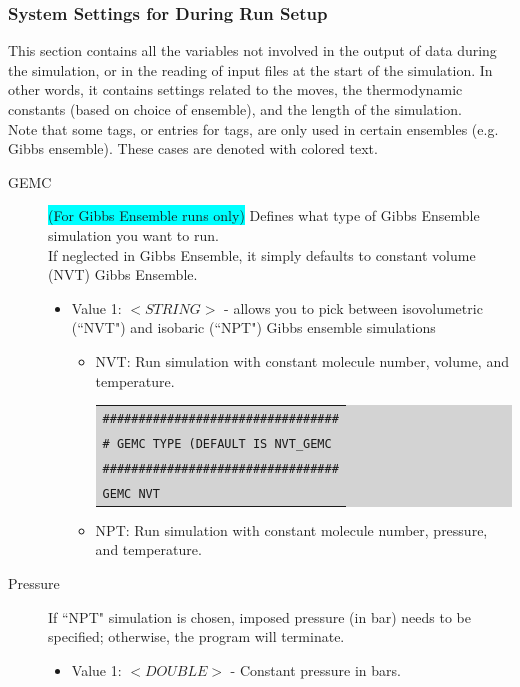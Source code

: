 \subsubsection{System Settings for During Run Setup}
This section contains all the variables not involved in the output of data during the simulation, or in the reading of input files at the start of the simulation.  In other words, it contains settings related to the moves, the thermodynamic constants (based on choice of ensemble), and the length of the simulation.\\
Note that some tags, or entries for tags, are only used in certain ensembles (e.g. Gibbs ensemble). These cases are denoted with colored text.\\
\begin{description}
\item [GEMC] \colorbox{cyan}{(For Gibbs Ensemble runs only)} Defines what type of Gibbs Ensemble simulation you want to run.\\
	If neglected in Gibbs Ensemble, it simply defaults to constant volume (NVT) Gibbs Ensemble.
	\begin{itemize}
	\item Value 1: $<STRING>$ - allows you to pick between isovolumetric (``NVT") and isobaric (``NPT") Gibbs ensemble simulations
		\begin{itemize}
		\item NVT: Run simulation with constant molecule number, volume, and temperature.\\
		\colorbox{lightgray}{
		\begin{tabular}{l}
		\texttt{\#\#\#\#\#\#\#\#\#\#\#\#\#\#\#\#\#\#\#\#\#\#\#\#\#\#\#\#\#\#\#\#\#}\\
		\texttt{\# GEMC TYPE (DEFAULT IS NVT\_GEMC}\\
		\texttt{\#\#\#\#\#\#\#\#\#\#\#\#\#\#\#\#\#\#\#\#\#\#\#\#\#\#\#\#\#\#\#\#\#}\\
		\texttt{GEMC    NVT}\\
		\end{tabular}}
		\item NPT: Run simulation with constant molecule number, pressure, and temperature.
		\end{itemize}
	\end{itemize}
\item [Pressure] If ``NPT" simulation is chosen, imposed pressure (in bar) needs to be specified; otherwise, the program will terminate.
	\begin{itemize}
	\item Value 1: $<DOUBLE>$ - Constant pressure in bars.\\

\end{itemize}
\end{description}
